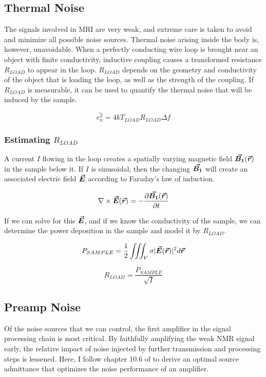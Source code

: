 \subsection{Thermal Noise}
The signals involved in MRI are very weak, and extreme care is taken to avoid and minimize all possible noise
sources. Thermal noise arising inside the body is, however, unavoidable. When a perfectly conducting wire loop is
brought near an object with finite conductivity, inductive coupling causes a transformed resistance $R_{LOAD}$ to appear
in the loop. $R_{LOAD}$ depends on the geometry and conductivity of the object that is loading the loop, as well as the
strength of the coupling. If $R_{LOAD}$ is measurable, it can be used to quantify the thermal noise that will be induced
by the sample.

\begin{equation}\label{eq:thermal_noise}
    \bar{e_n^2} = 4 k T_{LOAD} R_{LOAD} \Delta f
\end{equation}

\subsubsection{Estimating $R_{LOAD}$}

A current $I$ flowing in the loop creates a spatially varying magnetic field $\bm{\vec{B_1}}(\bm{\vec{r}})$ in the sample below it. If $I$
is sinusoidal, then the changing $\bm{\vec{B_1}}$ will create an associated electric field $\bm{\vec{E}}$ according to Faraday's
law of induction.

\begin{equation}\label{eq:differential_faraday}
    \nabla \times \bm{\vec{E}}(\bm{\vec{r}}) = - \frac{\partial \bm{\vec{B_1}}(\bm{\vec{r}})}{\partial t}
\end{equation}

If we can solve for this $\bm{\vec{E}}$, and if we know the conductivity of the sample, we can determine the power
deposition in the sample and model it by $R_{LOAD}$.

\begin{equation}\label{eq:P_sample}
    P_{SAMPLE} = \frac{1}{2} \iiint_V \sigma |\bm{\vec{E}}(\bm{\vec{r}})|^2 d\bm{\vec{r}}
\end{equation} 

\begin{equation}
    R_{LOAD} = \frac{P_{SAMPLE}}{\sqrt{I}} 
\end{equation}

\subsection{Preamp Noise}
Of the noise sources that we can control, the first amplifier in the signal processing chain is most critical. By
faithfully amplifying the weak NMR signal early, the relative impact of noise injected by further transmission and
processing steps is lessened. Here, I follow chapter 10.6 of \cite{lee2004} to derive an optimal source admittance that
optimizes the noise performance of an amplifier.

